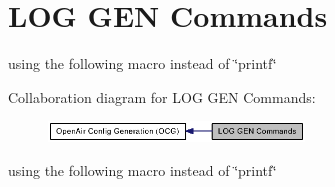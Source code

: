\section{LOG GEN Commands}
\label{group____log__gen}
using the following macro instead of \char`\"{}printf\char`\"{}  




Collaboration diagram for LOG GEN Commands:\nopagebreak
\begin{figure}[H]
\begin{center}
\leavevmode
\includegraphics[width=193pt]{group____log__gen}
\end{center}
\end{figure}
using the following macro instead of \char`\"{}printf\char`\"{} 